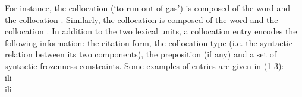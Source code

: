 \documentclass[output=paper]{langsci/langscibook}
\begin{document}
For\ili{} instance\ili{},\ili{} the\ili{} \ili{}\ili{}\ili{} collocation\ili{} \ili{}\textit{}\ili{} \ili{}(\ili{}`to\ili{} run\ili{} out\ili{} of\ili{} gas\ili{}'\ili{})\ili{} is\ili{} composed\ili{} of\ili{} the\ili{} word\ili{} \ili{}\textit{}\ili{} and\ili{} the\ili{} collocation\ili{} \ili{}\textit{}\ili{}.\ili{} Similarly\ili{},\ili{} the\ili{} \ili{}\ili{}\ili{} collocation\ili{} \ili{}
\ili{}\textit{}\ili{} is\ili{} composed\ili{} of\ili{} the\ili{} word\ili{} \ili{}\textit{}\ili{} and\ili{} the\ili{} collocation\ili{} \ili{}\textit{}\ili{}.\ili{}
\ili{}
In\ili{} addition\ili{} to\ili{} the\ili{} two\ili{} lexical\ili{} units\ili{},\ili{} a\ili{} collocation\ili{} entry\ili{} encodes\ili{} the\ili{} following\ili{} information\ili{}:\ili{} \ili{}
the\ili{} citation\ili{} form\ili{},\ili{} the\ili{} collocation\ili{} type\ili{} \ili{}(i\ili{}.e\ili{}.\ili{} the\ili{} syntactic\ili{} relation\ili{} between\ili{} its\ili{} two\ili{} components\ili{})\ili{},\ili{} the\ili{} preposition\ili{} \ili{}(if\ili{} any\ili{})\ili{} and\ili{} a\ili{} set\ili{} of\ili{} syntactic\ili{} frozenness\ili{} constraints\ili{}.\ili{} \ili{}
\ili{}
Some\ili{} examples\ili{} of\ili{} \ili{} entries\ili{} are\ili{} given\ili{} in\ili{} \ili{}(1\ili{}-3\ili{})\ili{}:\ili{}\\ili{}\\ili{}
\ili{}
\end{document}
